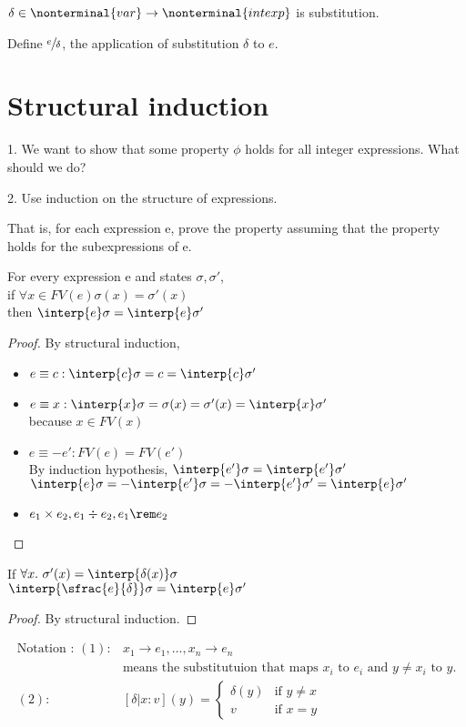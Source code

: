 \documentclass{report}[12pt]
\begin{document}
$\delta \in \nonterminal{var} \rightarrow \nonterminal{intexp}$ is substitution.

Define $\sfrac{e}{\delta}$, the application of substitution $\delta$ to $e$.
\section{Structural induction}
1. We want to show that some property $\phi$ holds for all integer expressions. What should we do?

2. Use induction on the structure of expressions.

That is, for each expression e, prove the property assuming that the property holds for the subexpressions of e.
\begin{lemma}[Coincidence]
    For every expression e and states $\sigma, \sigma'$, \\
    if $\forall x\in FV(e) \sigma(x) = \sigma'(x) $ \\
    then $\interp{ e } \sigma = \interp{ e } \sigma'$
\end{lemma}
\begin{proof}
    By structural induction,
    \begin{itemize}
        \item $e \equiv c : \interp{ c } \sigma = c =  \interp{ c } \sigma' $
        \item $e \equiv x : \interp{ x } \sigma = \sigma(x) = \sigma'(x) = \interp{ x } \sigma'$ \\
        because $x \in FV(x)$
        \item $e \equiv -e' : FV(e) = FV(e')$ \\
        By induction hypothesis, $\interp{ e' } \sigma = \interp{ e' } \sigma'$ \\
        $\interp{ e } \sigma = - \interp{ e' } \sigma = - \interp{ e' } \sigma' = \interp{ e } \sigma'$
        \item $e_1 \times e_2, e_1 \div e_2, e_1\rem e_2$
    \end{itemize}
\end{proof}
\begin{lemma}[Substitution]
    If $\forall x.\ \sigma'(x) = \interp{ \delta(x) } \sigma $ \\
    $\interp{ \sfrac{e}{\delta} } \sigma = \interp{ e } \sigma'$
\end{lemma}
\begin{proof}
    By structural induction.
\end{proof}
\begin{align*}
    \text{Notation : }(1) : &x_1 \rightarrow e_1, \ldots, x_n \rightarrow e_n \\
    &\text{means the substitutuion that maps } x_i \text{ to }e_i \text{ and }y\neq x_i \text{ to } y. \\
    (2) : &[\delta | x:v] (y) = \begin{cases} \delta(y) & \text{if }y\neq x \\ v &\text{if }x=y\end{cases}
\end{align*}
\end{document}
